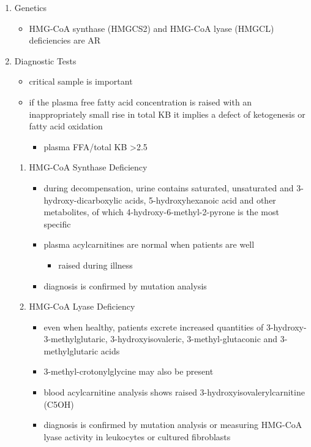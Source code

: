 \documentclass{scrartcl}
\begin{document}
\begin{enumerate}
\item Genetics
\label{sec:org7076f8f}
\begin{itemize}
\item HMG-CoA synthase (HMGCS2) and HMG-CoA lyase (HMGCL) deficiencies are
AR
\end{itemize}

\item Diagnostic Tests
\label{sec:org42cc699}
\begin{itemize}
\item critical sample is important
\item if the plasma free fatty acid concentration is raised with an
inappropriately small rise in total KB it implies a defect of
ketogenesis or fatty acid oxidation 
\begin{itemize}
\item plasma FFA/total KB >2.5
\end{itemize}
\end{itemize}

\begin{enumerate}
\item HMG-CoA Synthase Deficiency
\label{sec:org25e75f1}
\begin{itemize}
\item during decompensation, urine contains saturated, unsaturated and
3-hydroxy-dicarboxylic acids, 5-hydroxyhexanoic acid and other
metabolites, of which 4-hydroxy-6-methyl-2-pyrone is the most
specific
\item plasma acylcarnitines are normal when patients are well
\begin{itemize}
\item raised during illness
\end{itemize}
\item diagnosis is confirmed by mutation analysis
\end{itemize}

\item HMG-CoA Lyase Deficiency
\label{sec:orgb540dcf}
\begin{itemize}
\item even when healthy, patients excrete increased quantities of
3-hydroxy-3-methylglutaric, 3-hydroxyisovaleric, 3-methyl-glutaconic
and 3-methylglutaric acids
\item 3-methyl-crotonylglycine may also be present
\item blood acylcarnitine analysis shows raised
3-hydroxyisovalerylcarnitine (C5OH)
\item diagnosis is confirmed by mutation analysis or measuring HMG-CoA
lyase activity in leukocytes or cultured fibroblasts
\end{itemize}
\end{enumerate}


\end{enumerate}
\end{document}
